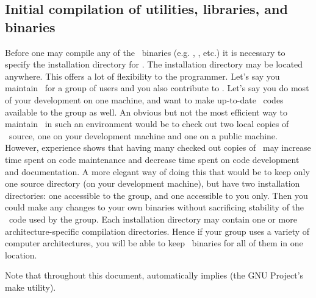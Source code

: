 \subsection{Initial compilation of utilities, libraries, and binaries}
Before one may compile any of the \PSIthree\ binaries (e.g. \PSIcscf, \PSIcints, etc.)
it is necessary to specify the installation directory for \PSIthree.
The installation directory may be located anywhere. This offers a lot of
flexibility to the programmer. Let's say you maintain \PSIthree\ for
a group of users and you also contribute to \PSIthree. Let's say you do most of your
development on one machine, and want to make up-to-date \PSIthree\ codes
available to the group as well. An obvious but not the most efficient way to
maintain \PSIthree\ in such
an environment would be to check out two local copies of \PSIthree\ source,
one on your development machine and one on a public machine.
However, experience shows that having many checked out copies of \PSIthree\ may
increase time spent on code maintenance and decrease time spent on code
development and documentation.
A more elegant way of doing this that would be to keep only one source directory
(on your development machine), but have two installation directories:
one accessible to the group, and one accessible to you only. Then you could make
any changes to your own binaries without sacrificing stability of the \PSIthree\ code used
by the group. Each installation directory may contain one or more architecture-specific
compilation directories. Hence if your group uses a variety of computer architectures,
you will be able to keep \PSIthree\ binaries for all of them in one location.

Note that throughout this document,  automatically implies  (the
GNU Project's make utility).

